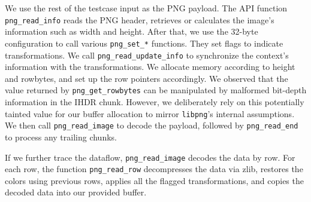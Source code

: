 \documentclass[letterpaper,twocolumn,10pt]{article}
\begin{document}
We use the rest of the testcase input as the PNG payload. The API function \lstinline|png_read_info| reads the PNG header, retrieves or calculates the image's information such as width and height. After that, we use the 32-byte configuration to call various \lstinline{png_set_*} functions. They set flags to indicate transformations. We call \lstinline|png_read_update_info| to synchronize the context's information with the transformations. We allocate memory according to height and rowbytes, and set up the row pointers accordingly. We observed that the value returned by \lstinline|png_get_rowbytes| can be manipulated by malformed bit-depth information in the IHDR chunk. However, we deliberately rely on this potentially tainted value for our buffer allocation to mirror \lstinline|libpng|'s internal assumptions. We then call \lstinline|png_read_image| to decode the payload, followed by \lstinline|png_read_end| to process any trailing chunks.

If we further trace the dataflow, \lstinline|png_read_image| decodes the data by row. For each row, the function \lstinline|png_read_row| decompresses the data via zlib, restores the colors using previous rows, applies all the flagged transformations, and copies the decoded data into our provided buffer.

\end{document}
